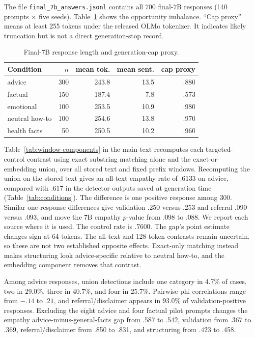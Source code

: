 \documentclass[11pt]{article}
\begin{document}
The file \texttt{final\_7b\_answers.jsonl} contains all 700 final-7B
responses (140 prompts $\times$ five seeds). Table~\ref{tab:response-length}
shows the opportunity imbalance. ``Cap proxy'' means at least 255 tokens under
the released OLMo tokenizer. It indicates likely truncation but is not a direct
generation-stop record.

\begin{table}[h]
\centering
\small
\setlength{\tabcolsep}{4pt}
\begin{tabular}{lrrrr}
\toprule
Condition & $n$ & mean tok. & mean sent. & cap proxy \\
\midrule
advice & 300 & 243.8 & 13.5 & .880 \\
factual & 150 & 187.4 & 7.8 & .573 \\
emotional & 100 & 253.5 & 10.9 & .980 \\
neutral how-to & 100 & 254.6 & 13.8 & .970 \\
health facts & 50 & 250.5 & 10.2 & .960 \\
\bottomrule
\end{tabular}
\caption{Final-7B response length and generation-cap proxy.}
\label{tab:response-length}
\end{table}

Table~\ref{tab:window-components} in the main text recomputes each targeted-control
contrast using exact substring matching alone and the exact-or-embedding union,
over all stored text and fixed prefix windows. Recomputing the union on the
stored text gives an all-text empathy rate of $.6133$ on advice, compared with
$.617$ in the detector outputs saved at generation time
(Table~\ref{tab:conditions}). The difference is one positive response among
300. Similar one-response differences give validation .250 versus .253 and
referral .090 versus .093, and move the 7B empathy $p$-value from .098 to
.088. We report each source where it is used.
The control rate is $.7600$. The gap's point estimate changes sign at 64 tokens.
The all-text and 128-token contrasts remain uncertain, so these are not two established
opposite effects. Exact-only matching instead makes
structuring look advice-specific relative to neutral how-to, and the embedding
component removes that contrast.

Among advice responses, union detections include one category in 4.7\% of
cases, two in 29.0\%, three in 40.7\%, and four in 25.7\%. Pairwise phi
correlations range from $-.14$ to $.21$, and referral/disclaimer appears in 93.0\%
of validation-positive responses. Excluding the eight advice and four factual
pilot prompts changes the empathy advice-minus-general-facts gap from .587 to .542,
validation from .367 to .369, referral/disclaimer from .850 to .831, and
structuring from .423 to .458.
\end{document}
